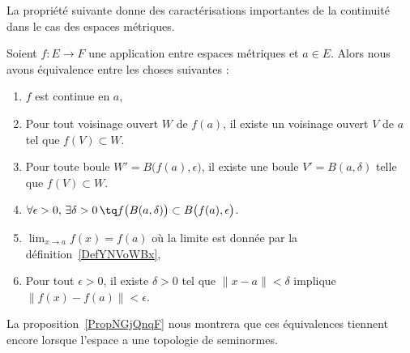 La propriété suivante donne des caractérisations importantes de la continuité dans le cas des espaces métriques.
\begin{proposition} \label{PropQZRNpMn}
	Soient \( f\colon E\to F\) une application entre espaces métriques et \( a\in E\). Alors nous avons équivalence entre les choses suivantes :
	\begin{enumerate}
		\item\label{ItemCBUoRWJi}
		      \( f\) est continue en \( a\),
		\item\label{ItemCBUoRWJii}
		      Pour tout voisinage ouvert \( W\) de \( f(a)\), il existe un voisinage ouvert \( V\) de \( a\) tel que \( f(V)\subset W\).
		\item\label{ItemCBUoRWJiii}
		      Pour toute boule \( W'=B\big( f(a),\epsilon \big)\), il existe une boule \( V'=B(a,\delta)\) telle que \( f(V)\subset W\).
		\item\label{ItemCBUoRWJiv}
		      \( \forall \epsilon>0,\,\exists \delta>0\,\tq f\big( B(a,\delta) \big)\subset B\big( f(a),\epsilon \big)\).
		\item\label{ItemYNQpikrii}
		      \( \lim_{x\to a}f(x)=f(a)\) où la limite est donnée par la définition~\ref{DefYNVoWBx},
		\item\label{ItemYNQpikriii}
		      Pour tout \( \epsilon>0\), il existe \( \delta>0\) tel que \( \| x-a \|<\delta\) implique \( \| f(x)-f(a) \|<\epsilon\).
	\end{enumerate}
\end{proposition}
La proposition~\ref{PropNGjQnqF} nous montrera que ces équivalences tiennent encore lorsque l'espace a une topologie de seminormes.

